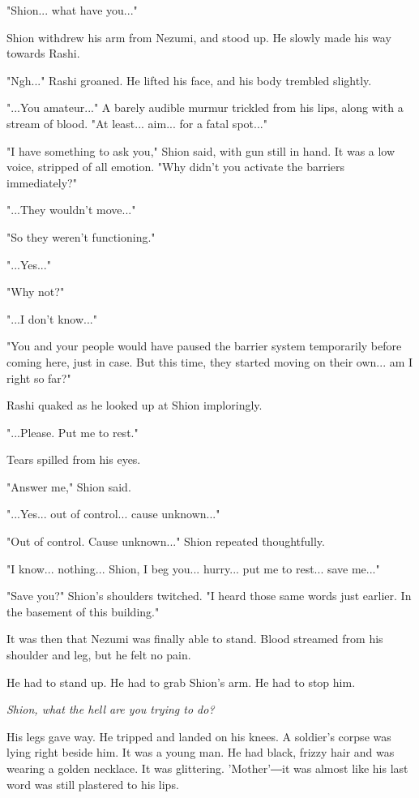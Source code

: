 "Shion... what have you..."

Shion withdrew his arm from Nezumi, and stood up. He slowly made his way
towards Rashi.

"Ngh..." Rashi groaned. He lifted his face, and his body trembled
slightly.

"...You amateur..." A barely audible murmur trickled from his lips,
along with a stream of blood. "At least... aim... for a fatal spot..."

"I have something to ask you," Shion said, with gun still in hand. It
was a low voice, stripped of all emotion. "Why didn't you activate the
barriers immediately?"

"...They wouldn't move..."

"So they weren't functioning."

"...Yes..."

"Why not?"

"...I don't know..."

"You and your people would have paused the barrier system temporarily
before coming here, just in case. But this time, they started moving on
their own... am I right so far?"

Rashi quaked as he looked up at Shion imploringly.

"...Please. Put me to rest."

Tears spilled from his eyes.

"Answer me," Shion said.

"...Yes... out of control... cause unknown..."

"Out of control. Cause unknown..." Shion repeated thoughtfully.

"I know... nothing... Shion, I beg you... hurry... put me to rest...
save me..."

"Save you?" Shion's shoulders twitched. "I heard those same words just
earlier. In the basement of this building."

It was then that Nezumi was finally able to stand. Blood streamed from
his shoulder and leg, but he felt no pain.

He had to stand up. He had to grab Shion's arm. He had to stop him.

\emph{Shion, what the hell are you trying to do?}

His legs gave way. He tripped and landed on his knees. A soldier's
corpse was lying right beside him. It was a young man. He had black,
frizzy hair and was wearing a golden necklace. It was glittering.
'Mother'―it was almost like his last word was still plastered to his
lips.

